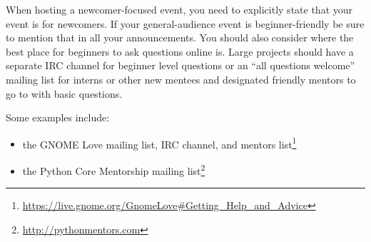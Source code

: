 When hosting a newcomer-focused event, you need to explicitly state that your event is for newcomers. If your general-audience event is beginner-friendly be sure to mention that in all your announcements. You should also consider where the best place for beginners to ask questions online is. Large projects should have a separate IRC channel for beginner level questions or an “all questions welcome” mailing list for interns or other new mentees and designated friendly mentors to go to with basic questions. 


Some examples include:
\begin{itemize}
 \item the GNOME Love mailing list, IRC channel, and mentors list\footnote{\url{https://live.gnome.org/GnomeLove\#Getting_Help_and_Advice}}
 \item the Python Core Mentorship mailing list\footnote{\url{http://pythonmentors.com}}
\end{itemize}

